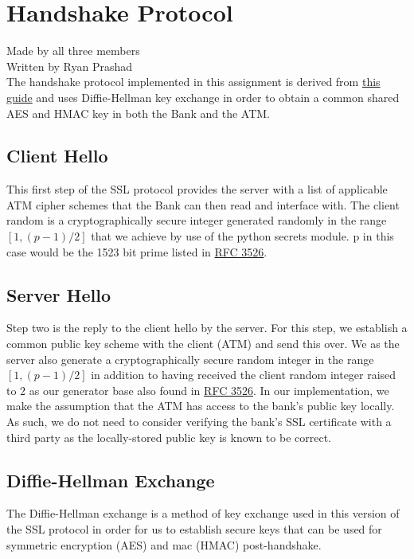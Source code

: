\section{Handshake Protocol}\label{sec:handshake}
Made by all three members\\
Written by Ryan Prashad\\

	\medskip
	The handshake protocol implemented in this assignment is derived from \href{https://www.cloudflare.com/learning/ssl/what-happens-in-a-tls-handshake/}{this guide} and uses Diffie-Hellman key exchange in order to obtain a 
	common shared AES and HMAC key in both the Bank and the ATM.
	
	\subsection{Client Hello}\label{sec:clihello}
		This first step of the SSL protocol provides the server with a list of applicable ATM cipher schemes that the Bank can then read and interface with. The 
		client random is a cryptographically secure integer generated randomly in the range $[1,(p-1)/2]$ that we achieve by use of the python secrets module. p in this case would be the 1523 bit prime listed in \href{https://www.ietf.org/rfc/rfc3526.txt}{RFC 3526}.
	
	\subsection{Server Hello}\label{sec:serhello}
		Step two is the reply to the client hello by the server. For this step, we establish a common public key scheme with the client (ATM) and send this over. We
		as the server also generate a cryptographically secure random integer in the range  $[1,(p-1)/2]$ in addition to having received the client random integer raised to 2 as our generator base also found in \href{https://www.ietf.org/rfc/rfc3526.txt}{RFC 3526}. In our implementation, we make the assumption that the ATM has access to the bank's public key locally. As such, we do not need to consider verifying the bank's SSL certificate with a third party as the locally-stored public key is known to be correct.
		
		\subsection{Diffie-Hellman Exchange}\label{sec:dhex}
			The Diffie-Hellman exchange is a method of key exchange used in this version of the SSL protocol in order for us to establish secure keys that can be used for symmetric encryption (AES) and mac (HMAC) post-handshake.

